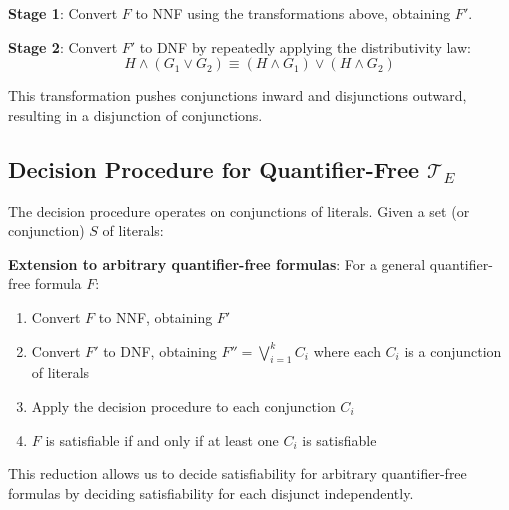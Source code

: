 \documentclass[11pt,a4paper]{article}
\theoremstyle{definition}
\theoremstyle{plain}
\theoremstyle{remark}
\begin{document}
\textbf{Stage 1}: Convert $F$ to NNF using the transformations above, obtaining $F'$.

\textbf{Stage 2}: Convert $F'$ to DNF by repeatedly applying the distributivity law:
\[
H \wedge (G_1 \vee G_2) \equiv (H \wedge G_1) \vee (H \wedge G_2)
\]

This transformation pushes conjunctions inward and disjunctions outward, resulting in a disjunction of conjunctions.

\subsection{Decision Procedure for Quantifier-Free $\mathcal{T}_E$}

The decision procedure operates on conjunctions of literals. Given a set (or conjunction) $S$ of literals:

\begin{center}
\end{center}

\textbf{Extension to arbitrary quantifier-free formulas}: For a general quantifier-free formula $F$:
\begin{enumerate}
    \item Convert $F$ to NNF, obtaining $F'$
    \item Convert $F'$ to DNF, obtaining $F'' = \bigvee_{i=1}^{k} C_i$ where each $C_i$ is a conjunction of literals
    \item Apply the decision procedure to each conjunction $C_i$
    \item $F$ is satisfiable if and only if at least one $C_i$ is satisfiable
\end{enumerate}

This reduction allows us to decide satisfiability for arbitrary quantifier-free formulas by deciding satisfiability for each disjunct independently.
\end{document}
